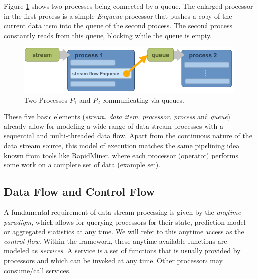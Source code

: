Figure \ref{fig:queues} shows two processes being connected by a
queue. The enlarged processor in the first process is a simple {\em
  Enqueue} processor that pushes a copy of the current data item into
the queue of the second process. The second process constantly reads
from this queue, blocking while the queue is empty.

\begin{figure}[h!]
  \begin{center}
    \includegraphics[scale=0.5]{graphics/process-queues.png}
  \end{center}
  \caption{\label{fig:queues}Two Processes $P_1$ and $P_2$ communicating via queues.}
\end{figure}

\bigskip

These five basic elements ({\em stream}, {\em data item}, {\em
  processor}, {\em process} and {\em queue}) already allow for
modeling a wide range of data stream processes with a sequential and
multi-threaded data flow. Apart from the continuous nature of the data stream source, this model
of execution matches the same pipelining idea known from tools like
RapidMiner, where each processor (operator) performs some work on a
complete set of data (example set).

\subsection{Data Flow and Control Flow}
A fundamental requirement of data stream processing is given by the
{\em anytime paradigm}, which allows for querying processors for their
state, prediction model or aggregated statistics at any time. We will
refer to this anytime access as the {\em control flow}.  Within the
\streams framework, these anytime available functions are modeled as {\em
  services}. A service is a set of functions that is usually provided
by processors and which can be invoked at any time. Other processors
may consume/call services. 

